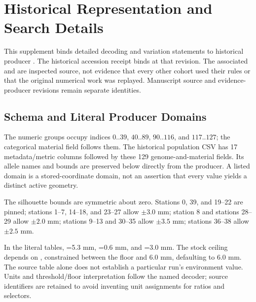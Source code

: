\section{Historical Representation and Search Details}
\label{supp:representation-search}
This supplement binds detailed decoding and variation statements to historical producer \href{https://github.com/neverhuman/jarambit/tree/82f450f7fb418e28c4b229031920dec5454435f3}{}. The historical accession receipt binds  at that revision. The associated  and  are inspected source, not evidence that every other cohort used their rules or that the original numerical work was replayed. Manuscript source and evidence-producer revisions remain separate identities.

\subsection{Schema and Literal Producer Domains}
The numeric groups occupy indices $0..39$, $40..89$, $90..116$, and $117..127$; the categorical material field follows them. The historical population CSV has 17 metadata/metric columns followed by these 129 genome-and-material fields. Its allele names and bounds are preserved below directly from the producer. A listed domain is a stored-coordinate domain, not an assertion that every value yields a distinct active geometry.

The silhouette bounds are symmetric about zero. Stations 0, 39, and 19--22 are pinned; stations 1--7, 14--18, and 23--27 allow $\pm3.0$ mm; station 8 and stations 28--29 allow $\pm2.0$ mm; stations 9--13 and 30--35 allow $\pm3.5$ mm; stations 36--38 allow $\pm2.5$ mm.

In the literal tables, =5.3 mm, =0.6 mm, and =3.0 mm. The stock ceiling  depends on , constrained between the floor and 6.0 mm, defaulting to 6.0 mm. The source table alone does not establish a particular run's environment value. Units and threshold/floor interpretation follow the named decoder; source identifiers are retained to avoid inventing unit assignments for ratios and selectors.

